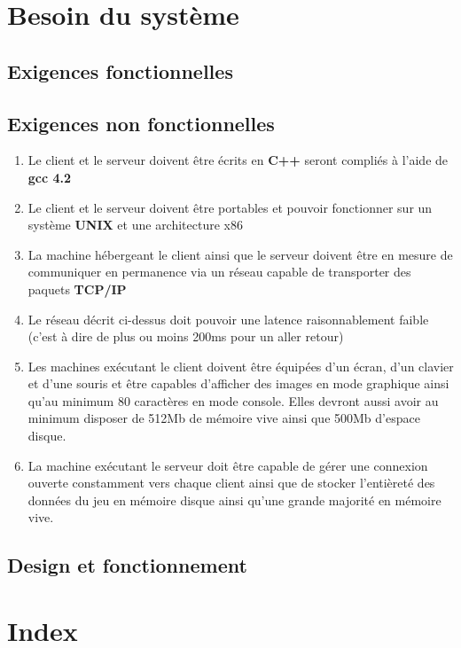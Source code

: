 \documentclass[a4paper]{article}
\begin{document}
\section{Besoin du système}
\subsection{Exigences fonctionnelles}
\subsection{Exigences non fonctionnelles}
\label{enf}

\begin{enumerate}
\item Le client et le serveur doivent être écrits en \textbf{C++} seront compliés à l'aide de \textbf{gcc 4.2}
\item Le client et le serveur doivent être portables et pouvoir fonctionner sur un système \textbf{UNIX} et une architecture x86
\item La machine hébergeant le client ainsi que le serveur doivent être en mesure de communiquer en permanence via un réseau capable de transporter des paquets \textbf{TCP/IP}
\item Le réseau décrit ci-dessus doit pouvoir une latence raisonnablement faible (c'est à dire de plus ou moins 200ms pour un aller retour)
\item Les machines exécutant le client doivent être équipées d'un écran, d'un clavier et d'une souris et être capables d'afficher des images en mode graphique ainsi qu'au minimum 80 caractères en mode console. Elles devront aussi avoir au minimum disposer de 512Mb de mémoire vive ainsi que 500Mb d'espace disque.
\item La machine exécutant le serveur doit être capable de gérer une connexion ouverte constamment vers chaque client ainsi que de stocker l'entièreté des données du jeu en mémoire disque ainsi qu'une grande majorité en mémoire vive.
\end{enumerate}


\subsection{Design et fonctionnement}
\section{Index}

\appendix
\end{document}
